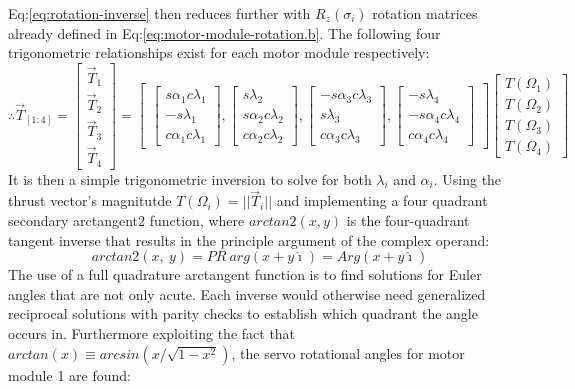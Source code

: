 Eq:\ref{eq:rotation-inverse} then reduces further with $R_z(\sigma_i)$ rotation matrices already defined in Eq:\ref{eq:motor-module-rotation.b}. The following four trigonometric relationships exist for each motor module respectively:
\begin{equation}\label{eq:5.13}
\therefore\vec{T}_{[1:4]}=
\begin{bmatrix}
\vec{T}_1\\
\vec{T}_2\\
\vec{T}_3\\
\vec{T}_4
\end{bmatrix}
=
\begin{bmatrix}
\begin{bmatrix}
s\alpha_1 c\lambda_1\\
-s\lambda_1 \\
c\alpha_1 c\lambda_1
\end{bmatrix}
,
\begin{bmatrix}
s\lambda_2\\
s\alpha_2 c\lambda_2\\
c\alpha_2 c\lambda_2
\end{bmatrix}
,
\begin{bmatrix}
-s\alpha_3 c\lambda_3\\
s\lambda_3\\
c\alpha_3 c\lambda_3
\end{bmatrix}
,
\begin{bmatrix}
-s\lambda_4\\
-s\alpha_4 c\lambda_4\\
c\alpha_4 c\lambda_4
\end{bmatrix}
\end{bmatrix}
\begin{bmatrix}
T(\Omega_1)\\
T(\Omega_2)\\
T(\Omega_3)\\
T(\Omega_4)
\end{bmatrix}
\end{equation}
It is then a simple trigonometric inversion to solve for both $\lambda_i$ and $\alpha_i$. Using the thrust vector's magnitutde $T(\Omega_i)=||\vec{T}_i||$ and implementing a four quadrant secondary arctangent2 function, where $arctan2(x,y)$ is the four-quadrant tangent inverse that results in the principle argument of the complex operand:
\begin{equation}
arctan2(x,~y)=PR~arg(x+y\hat{\imath})=Arg(x+y\hat{\imath})
\end{equation}
The use of a full quadrature arctangent function is to find solutions for Euler angles that are not only acute. Each inverse would otherwise need generalized reciprocal solutions with parity checks to establish which quadrant the angle occurs in. Furthermore exploiting the fact that $arctan(x)\equiv arcsin(x/\sqrt{1-x^2})$, the servo rotational angles for motor module 1 are found:
